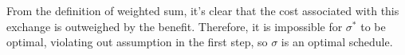 \documentclass[11pt]{article}
\begin{document}
	From the definition of weighted sum, it's clear that the cost associated with this exchange is outweighed by the benefit. Therefore, it is impossible for $\sigma^*$ to be optimal, violating out assumption in the first step, so $\sigma$ is an optimal schedule.
%		
%		


\end{document}
